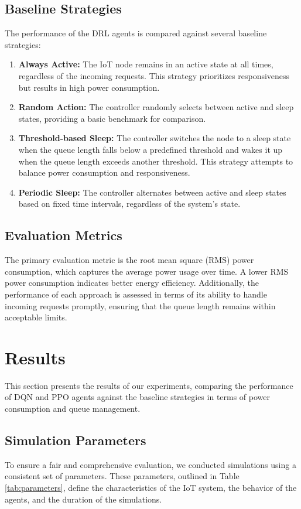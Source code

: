 \documentclass[11pt,a4paper]{article}
\begin{document}
\subsection{Baseline Strategies}
The performance of the DRL agents is compared against several baseline strategies:
\begin{enumerate}
    \item \textbf{Always Active:} The IoT node remains in an active state at all times, regardless of the incoming requests. This strategy prioritizes responsiveness but results in high power consumption.
    \item \textbf{Random Action:} The controller randomly selects between active and sleep states, providing a basic benchmark for comparison.
    \item \textbf{Threshold-based Sleep:} The controller switches the node to a sleep state when the queue length falls below a predefined threshold and wakes it up when the queue length exceeds another threshold. This strategy attempts to balance power consumption and responsiveness.
    \item \textbf{Periodic Sleep:} The controller alternates between active and sleep states based on fixed time intervals, regardless of the system's state.
\end{enumerate}

\subsection{Evaluation Metrics}
The primary evaluation metric is the root mean square (RMS) power consumption, which captures the average power usage over time. A lower RMS power consumption indicates better energy efficiency. Additionally, the performance of each approach is assessed in terms of its ability to handle incoming requests promptly, ensuring that the queue length remains within acceptable limits.

\section{Results}

This section presents the results of our experiments, comparing the performance of DQN and PPO agents against the baseline strategies in terms of power consumption and queue management.

\subsection{Simulation Parameters}
To ensure a fair and comprehensive evaluation, we conducted simulations using a consistent set of parameters. These parameters, outlined in Table \ref{tab:parameters}, define the characteristics of the IoT system, the behavior of the agents, and the duration of the simulations.
\end{document}
